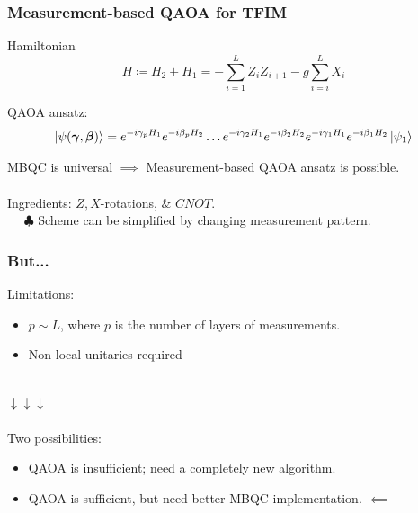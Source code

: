 \documentclass{beamer}
\theoremstyle{definition}
\begin{document}



\begin{frame}
\frametitle{Measurement-based QAOA for TFIM}

Hamiltonian
\begin{equation*}
H \coloneqq H_2 + H_1 =  - \sum_{i=1}^L Z_i Z_{i+1} - g\sum^L_{i=i}X_i
\end{equation*}


QAOA ansatz:
\begin{equation*}
\left\vert{\psi(\bm{\gamma}, \bm{\beta})}\right\rangle =  \strut {e^{-i\gamma_p H_1}e^{-i\beta_p H_2}} \dots {e^{-i\gamma_2 H_1}e^{-i\beta_2 H_2}} {e^{-i\gamma_1 H_1}e^{-i\beta_1 H_2}} \left\vert{\psi_1}\right\rangle
\end{equation*}

MBQC is universal $\implies$ Measurement-based QAOA ansatz is possible. \\

$\,$\\

Ingredients: $Z,X$-rotations, \& $CNOT$. \\

$\quad$ $\clubsuit$ Scheme can be simplified by changing measurement pattern.  

\end{frame}




\begin{frame}
\frametitle{But...}
Limitations: 
\begin{itemize}
	\item $p \sim L$, where $p$ is the number of layers of measurements. 
	\item Non-local unitaries required
\end{itemize}




$\,$\\
$\downarrow\downarrow\downarrow$\\

$\,$\\

Two possibilities:
\begin{itemize}
	\item QAOA is insufficient; need a completely new algorithm.
	\item QAOA is sufficient, but need better MBQC implementation. 	$\impliedby$ %


\end{itemize} 



\end{frame}
\end{document}

